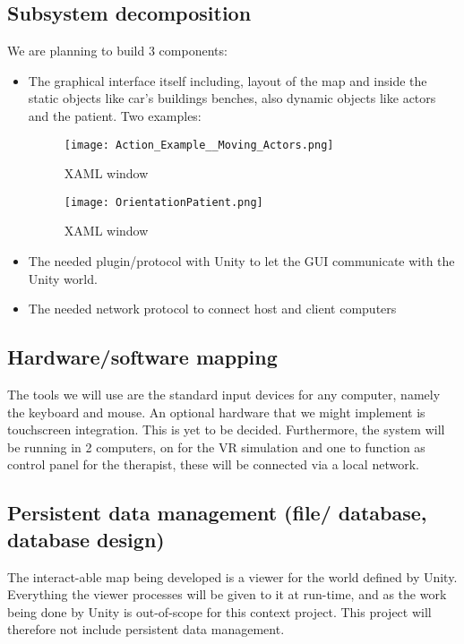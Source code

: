 \documentclass[11pt]{article}
\begin{document}
    \subsection{Subsystem decomposition}
    We are planning to build 3 components:
	\begin{itemize}
  		\item The graphical interface itself including, layout of the map and inside the static objects like car's buildings benches, also dynamic objects like actors and the patient. Two examples:
        \begin{figure}[H]
              \caption{XAML window}
              \texttt{[image: Action\_Example\_\_Moving\_Actors.png]}             
          \end{figure}
          
          \begin{figure}[H]
              \caption{XAML window}
              \texttt{[image: OrientationPatient.png]}             
          \end{figure}
  		\item The needed plugin/protocol with Unity to let the GUI communicate with the Unity world.
        \item The needed network protocol to connect host and client computers
	\end{itemize}   
    
    \subsection{Hardware/software mapping }
    The tools we will use are the standard input devices for any computer, namely the keyboard and mouse. An optional hardware that we might implement is touchscreen integration. This is yet to be decided.
    Furthermore, the system will be running in 2 computers, on for the VR simulation and one to function as control panel for the therapist, these will be connected via a local network.
    
    \subsection{Persistent data management (file/ database, database design)}
    The interact-able map being developed is a viewer for the world defined by Unity. Everything the viewer processes will be given to it at run-time, and as the work being done by Unity is out-of-scope for this context project. This project will therefore not include persistent data management.
    
\end{document}

